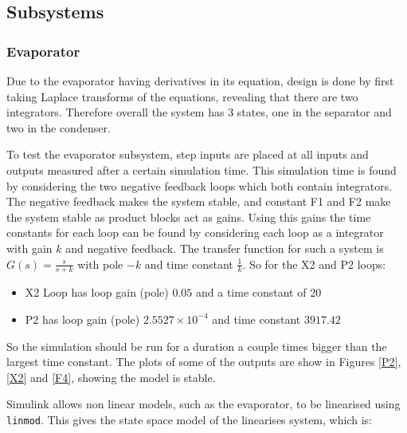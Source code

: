 \documentclass[11pt]{article}
\begin{document}
\subsection{Subsystems}
\subsubsection{Evaporator}
Due to the evaporator having derivatives in its equation, design is done by first taking Laplace transforms of the equations, revealing that there are two integrators. Therefore overall the system has 3 states, one in the separator and two in the condenser.

To test the evaporator subsystem, step inputs are placed at all inputs and outputs measured after a certain simulation time. This simulation time is found by considering the two negative feedback loops which both contain integrators. The negative feedback makes the system stable, and constant F1 and F2 make the system stable as product blocks act as gains. Using this gains the time constants for each loop can be found by considering each loop as a integrator with gain $k$ and negative feedback. The transfer function for such a system is $G(s) = \frac{s}{s+k}$ with pole $-k$  and time constant $\frac{1}{k}$. So for the X2 and P2 loops:

\begin{itemize}
\item X2 Loop has loop gain (pole) $0.05$ and a time constant of 20 
\item P2 has loop gain (pole) $2.5527 \times 10^{-4}$ and time constant $3917.42$ 
\end{itemize} 

So the simulation should be run for a duration a couple times bigger than the largest time constant. The plots of some of the outputs are show in Figures \ref{P2}, \ref{X2} and \ref{F4}, showing the model is stable.

Simulink allows non linear models, such as the evaporator, to be linearised using \texttt{linmod}. This gives the state space model of the linearises system, which is:
\end{document}
